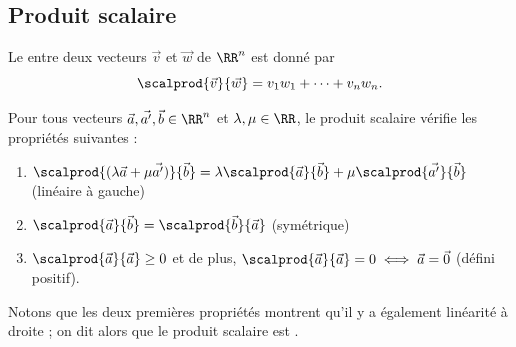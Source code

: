 \documentclass[french,xcolor=svgnames]{beamer}
\begin{document}


\subsection{Produit scalaire}\label{sec:produit-scalaire}
\begin{frame}%
\begin{definition}
  Le  entre deux vecteurs \(\vec v\) et \(\vec w\) de \(\RR^{n}\) est donné par
  \begin{equation*}
    \scalprod {\vec v} {\vec w} = v_{1} w_{1} + \cdots + v_{n} w_{n}.
  \end{equation*}
\end{definition}

\begin{proposition}Pour tous vecteurs \(\vec a,\vec {a'},\vec b \in \RR^{n}\) et \(\lambda, \mu \in \RR\), le produit scalaire vérifie les propriétés suivantes :
  \begin{enumerate}
  \item $\scalprod{(\lambda \vec{a} + \mu \vec{a'})}{\vec{b}} = \lambda \scalprod{\vec{a}}{\vec{b}} + \mu \scalprod{\vec{a'}}{\vec{b}}$ (linéaire à gauche)
  \item $\scalprod{\vec{a}}{\vec{b}}=\scalprod{\vec{b}}{\vec{a}}$ (symétrique)
  \item $\scalprod{\vec{a}}{\vec{a}} \geq 0$ et de plus, $\scalprod{\vec{a}}{\vec{a}} = 0 \iff \vec{a} = \vec 0$ (défini positif).
  \end{enumerate}
\end{proposition}
Notons que les deux premières propriétés montrent qu'il y a également linéarité à droite ; on dit alors que le produit scalaire est .
\end{frame}
\end{document}
